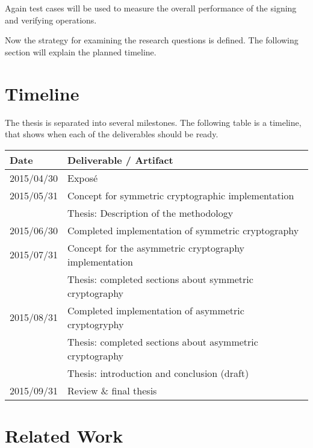 \documentclass[a4paper,12pt]{article}
\begin{document}
Again test cases will be used to measure the overall performance of the signing and verifying operations.

Now the strategy for examining the research questions is defined. The following section will explain the planned timeline.

\section{Timeline}

The thesis is separated into several milestones. The following table is a timeline, that shows when each of the deliverables should be ready.

\begin{table}[h]
\begin{tabular}{ll}
\textbf{Date} & \textbf{Deliverable / Artifact}                                           \\ \hline
2015/04/30    & Exposé                                                                    \\ \hline
2015/05/31    & Concept for symmetric cryptographic implementation                        \\
              & Thesis: Description of the methodology                                    \\ \hline
2015/06/30    & Completed implementation of symmetric cryptography                        \\ \hline
2015/07/31    & Concept for the asymmetric cryptography implementation                    \\
              & Thesis: completed sections about symmetric cryptography                   \\ \hline
2015/08/31    & Completed implementation of asymmetric cryptogryphy                       \\
              & Thesis: completed sections about asymmetric cryptography                  \\
              & Thesis: introduction and conclusion (draft)                               \\ \hline
2015/09/31    & Review \& final thesis                                                   
\end{tabular}
\end{table}

\section{Related Work}

\begingroup
\renewcommand{\section}[2]{}
\renewcommand{\refname}{}
\nocite{*}


\endgroup
\end{document}
